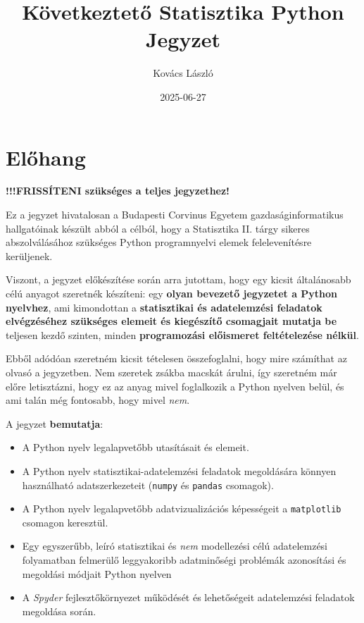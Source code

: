 \documentclass[
]{book}
\title{Következtető Statisztika Python Jegyzet}
\author{Kovács László}
\date{2025-06-27}
\providecommand{\tightlist}{%
  \setlength{\itemsep}{0pt}\setlength{\parskip}{0pt}}
\let\oldmaketitle\maketitle
\begin{document}
\maketitle


\newpage

\let\maketitle\oldmaketitle
\maketitle

{
\setcounter{tocdepth}{1}
\tableofcontents
}
\chapter{Előhang}\label{elux151hang}

\textbf{!!!FRISSÍTENI szükséges a teljes jegyzethez!}

Ez a jegyzet hivatalosan a Budapesti Corvinus Egyetem gazdaságinformatikus hallgatóinak készült abból a célból, hogy a Statisztika II. tárgy sikeres abszolválásához szükséges Python programnyelvi elemek felelevenítésre kerüljenek.

Viszont, a jegyzet előkészítése során arra jutottam, hogy egy kicsit általánosabb célú anyagot szeretnék készíteni: egy \textbf{olyan bevezető jegyzetet a Python nyelvhez}, ami kimondottan a \textbf{statisztikai és adatelemzési feladatok elvégzéséhez szükséges elemeit és kiegészítő csomagjait mutatja be} teljesen kezdő szinten, minden \textbf{programozási előismeret feltételezése nélkül}.

Ebből adódóan szeretném kicsit tételesen összefoglalni, hogy mire számíthat az olvasó a jegyzetben. Nem szeretek zsákba macskát árulni, így szeretném már előre letisztázni, hogy ez az anyag mivel foglalkozik a Python nyelven belül, és ami talán még fontosabb, hogy mivel \emph{nem}.

A jegyzet \textbf{bemutatja}:

\begin{itemize}
\tightlist
\item
  A Python nyelv legalapvetőbb utasításait és elemeit.
\item
  A Python nyelv statisztikai-adatelemzési feladatok megoldására könnyen használható adatszerkezeteit (\texttt{numpy} és \texttt{pandas} csomagok).
\item
  A Python nyelv legalapvetőbb adatvizualizációs képességeit a \texttt{matplotlib} csomagon keresztül.
\item
  Egy egyszerűbb, leíró statisztikai és \emph{nem} modellezési célú adatelemzési folyamatban felmerülő leggyakoribb adatminőségi problémák azonosítási és megoldási módjait Python nyelven
\item
  A \emph{Spyder} fejlesztőkörnyezet működését és lehetőségeit adatelemzési feladatok megoldása során.
\end{itemize}
\end{document}
